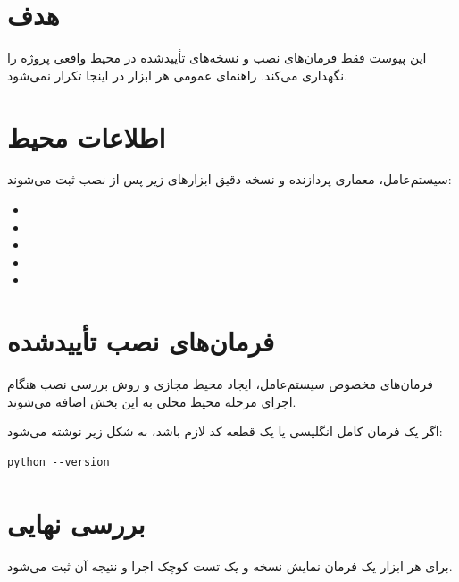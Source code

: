 \section{هدف}
این پیوست فقط فرمان‌های نصب و نسخه‌های تأییدشده در محیط واقعی پروژه را نگهداری می‌کند. راهنمای عمومی هر ابزار در اینجا تکرار نمی‌شود.

\section{اطلاعات محیط}
سیستم‌عامل، معماری پردازنده و نسخه دقیق ابزارهای زیر پس از نصب ثبت می‌شوند:

\begin{itemize}
    \item
    \item
    \item
    \item
    \item
\end{itemize}

\section{فرمان‌های نصب تأییدشده}
فرمان‌های مخصوص سیستم‌عامل، ایجاد محیط مجازی و روش بررسی نصب هنگام اجرای مرحله محیط محلی به این بخش اضافه می‌شوند.

اگر یک فرمان کامل انگلیسی یا یک قطعه کد لازم باشد، به شکل زیر نوشته می‌شود:

\begin{LTR}
\begin{lstlisting}
python --version
\end{lstlisting}
\end{LTR}

\section{بررسی نهایی}
برای هر ابزار یک فرمان نمایش نسخه و یک تست کوچک اجرا و نتیجه آن ثبت می‌شود.
